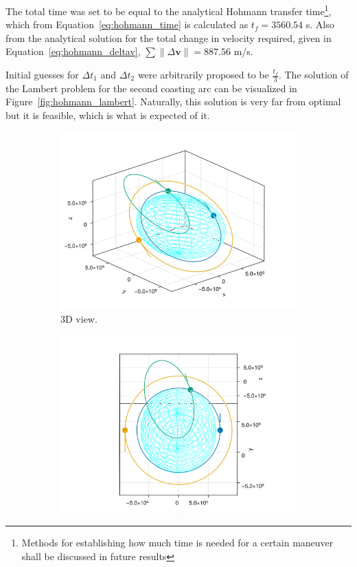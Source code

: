 The total time was set to be equal to the analytical Hohmann transfer time\footnote{Methods for establishing how much time is needed for a certain maneuver shall be discussed in future results}, which from Equation~\eqref{eq:hohmann_time} is calculated as \(t_f = 3560.54\) s. Also from the analytical solution for the total change in velocity required, given in Equation~\eqref{eq:hohmann_deltav}, \(\sum \lVert \Delta \mathbf{v} \rVert = 887.56\) m/s.

Initial guesses for \(\Delta t_1\) and \(\Delta t_2\) were arbitrarily proposed to be \(\frac{t_f}{3}\). The solution of the Lambert problem for the second coasting arc can be visualized in Figure~\ref{fig:hohmann_lambert}. Naturally, this solution is very far from optimal but it is feasible, which is what is expected of it.

\begin{figure}[htbp]
    \centering
    \begin{subfigure}{0.49\textwidth}
        \includegraphics[width=\textwidth]{img/hohmann_lambert_guess.png}
        \caption{3D view.}
    \end{subfigure}
    \begin{subfigure}{0.49\textwidth}
        \includegraphics[width=\textwidth]{img/hohmann_lambert_guess_in_plane.png}

\end{subfigure}
\end{figure}
